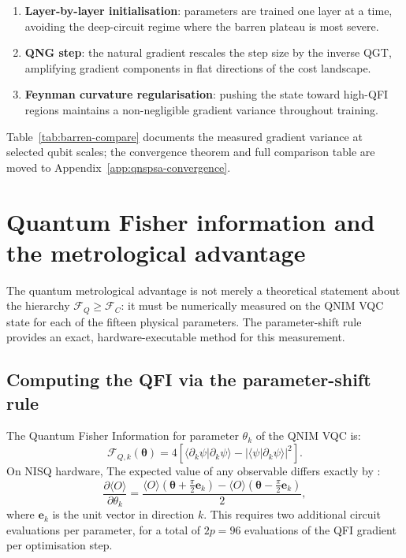 \documentclass[11pt,a4paper, english]{book}
\theoremstyle{plain}
\theoremstyle{definition}
\numberwithin{equation}{chapter}
\numberwithin{figure}{chapter}
\numberwithin{table}{chapter}
\begin{document}
\begin{enumerate}
  \item \textbf{Layer-by-layer initialisation}: parameters are trained
        one layer at a time, avoiding the deep-circuit regime where the
        barren plateau is most severe.
  \item \textbf{QNG step}: the natural gradient rescales the step size by
        the inverse QGT, amplifying gradient components in flat directions
        of the cost landscape.
  \item \textbf{Feynman curvature regularisation}: pushing the state toward
        high-QFI regions maintains a non-negligible gradient variance
        throughout training.
\end{enumerate}

Table~\ref{tab:barren-compare} documents the measured gradient variance
at selected qubit scales; the convergence theorem and full comparison table are moved to Appendix~\ref{app:qnspsa-convergence}.

\section{Quantum Fisher information and the metrological advantage}
\label{sec:qfi_methodology}

The quantum metrological advantage is not merely a theoretical statement about
the hierarchy $\mathcal{F}_Q \geq \mathcal{F}_C$: it must be numerically measured
on the QNIM VQC state for each of the fifteen physical parameters. The parameter-shift
rule provides an exact, hardware-executable method for this measurement.

\subsection{Computing the QFI via the parameter-shift rule}
\label{subsec:parameter_shift}

The Quantum Fisher Information for parameter $\theta_k$ of the QNIM VQC
is:
\begin{equation}
  \label{eq:qfi_vqc}
  \mathcal{F}_{Q,k}(\boldsymbol{\theta}) = 4\left[
    \langle\partial_k\psi|\partial_k\psi\rangle
    - \left|\langle\psi|\partial_k\psi\rangle\right|^2
  \right].
\end{equation}
On NISQ hardware, The expected value of any observable differs exactly by \cite{Mitarai_2018,Schuld_2019}:
\begin{equation}
  \label{eq:param_shift}
  \frac{\partial\langle O\rangle}{\partial\theta_k} =
  \frac{\langle O\rangle(\boldsymbol{\theta} + \frac{\pi}{2}\mathbf{e}_k)
        - \langle O\rangle(\boldsymbol{\theta} - \frac{\pi}{2}\mathbf{e}_k)}
       {2},
\end{equation}
where $\mathbf{e}_k$ is the unit vector in direction $k$.  This requires
two additional circuit evaluations per parameter, for a total of
$2p = 96$ evaluations of the QFI gradient per optimisation step.
\end{document}

